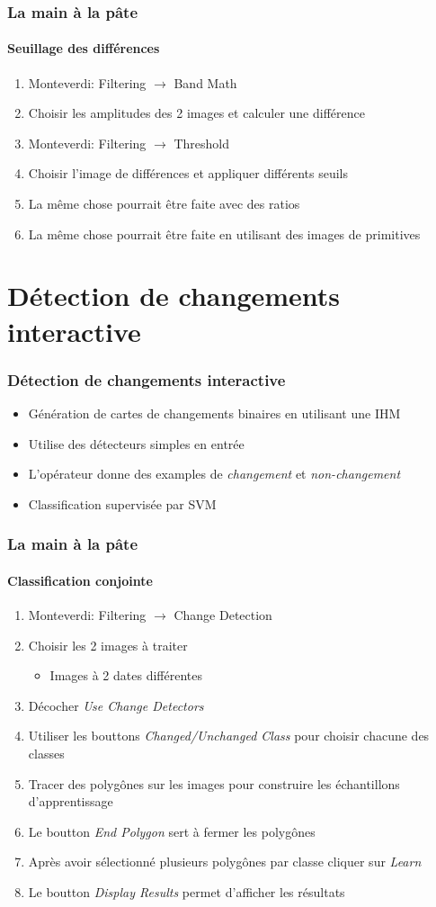 \documentclass[compress]{beamer}
\begin{document}
\begin{frame}
  \frametitle{La main à la pâte}
  \framesubtitle{Seuillage des différences}
  \begin{enumerate}
  \item Monteverdi: Filtering $\rightarrow$ Band Math
  \item Choisir les amplitudes des 2 images et calculer une différence
  \item Monteverdi: Filtering $\rightarrow$ Threshold
  \item Choisir l'image de différences et appliquer différents seuils
  \item La même chose pourrait être faite avec des ratios
  \item La même chose pourrait être faite en utilisant des images de primitives
  \end{enumerate}
\end{frame}


\section[Application]{Détection de changements interactive}

\begin{frame}
  \frametitle{Détection de changements interactive}
  \begin{itemize}
    \item Génération de cartes de changements binaires en utilisant une
      IHM
    \item Utilise des détecteurs simples en entrée
    \item L'opérateur donne des examples de {\em changement} et {\em non-changement}
    \item Classification supervisée par SVM
  \end{itemize}
\end{frame}


\begin{frame}
  \frametitle{La main à la pâte}
  \framesubtitle{Classification conjointe}
  \begin{enumerate}
  \item Monteverdi: Filtering $\rightarrow$ Change Detection
  \item Choisir les 2 images à traiter
    \begin{itemize}
    \item Images à 2 dates différentes
    \end{itemize}
  \item Décocher {\em Use Change Detectors}
  \item Utiliser les bouttons {\em Changed/Unchanged Class} pour
    choisir chacune des classes
  \item Tracer des polygônes sur les images pour construire les
    échantillons d'apprentissage
  \item Le boutton {\em End Polygon} sert à fermer les polygônes
  \item Après avoir sélectionné plusieurs polygônes par classe cliquer
    sur {\em Learn}
  \item Le boutton {\em Display Results} permet d'afficher les résultats
  \end{enumerate}
\end{frame}
\end{document}

